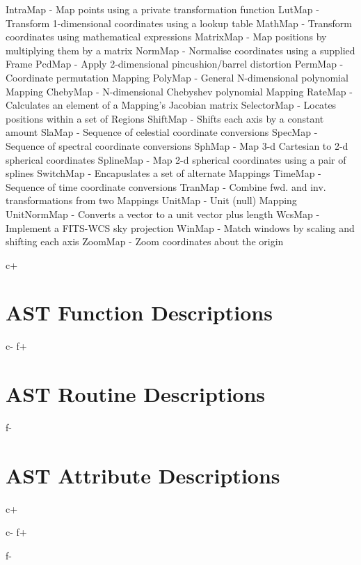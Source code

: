 \documentclass[twoside,11pt]{starlink}
\begin{document}
\begin{terminalv}
      IntraMap     - Map points using a private transformation function
      LutMap       - Transform 1-dimensional coordinates using a lookup table
      MathMap      - Transform coordinates using mathematical expressions
      MatrixMap    - Map positions by multiplying them by a matrix
      NormMap      - Normalise coordinates using a supplied Frame
      PcdMap       - Apply 2-dimensional pincushion/barrel distortion
      PermMap      - Coordinate permutation Mapping
      PolyMap      - General N-dimensional polynomial Mapping
        ChebyMap   - N-dimensional Chebyshev polynomial Mapping
      RateMap      - Calculates an element of a Mapping's Jacobian matrix
      SelectorMap  - Locates positions within a set of Regions
      ShiftMap     - Shifts each axis by a constant amount
      SlaMap       - Sequence of celestial coordinate conversions
      SpecMap      - Sequence of spectral coordinate conversions
      SphMap       - Map 3-d Cartesian to 2-d spherical coordinates
      SplineMap    - Map 2-d spherical coordinates using a pair of splines
      SwitchMap    - Encapuslates a set of alternate Mappings
      TimeMap      - Sequence of time coordinate conversions
      TranMap      - Combine fwd. and inv. transformations from two Mappings
      UnitMap      - Unit (null) Mapping
      UnitNormMap  - Converts a vector to a unit vector plus length
      WcsMap       - Implement a FITS-WCS sky projection
      WinMap       - Match windows by scaling and shifting each axis
      ZoomMap      - Zoom coordinates about the origin
\end{terminalv}
\normalsize

\cleardoublepage
c+
\section{\label{ss:functiondescriptions}AST Function Descriptions}
\small

\normalsize
c-
f+
\section{\label{ss:functiondescriptions}AST Routine Descriptions}
\small

\normalsize
f-

\cleardoublepage
\section{\label{ss:attributedescriptions}AST Attribute Descriptions}
\small
c+

c-
f+

f-
\normalsize
\end{document}
